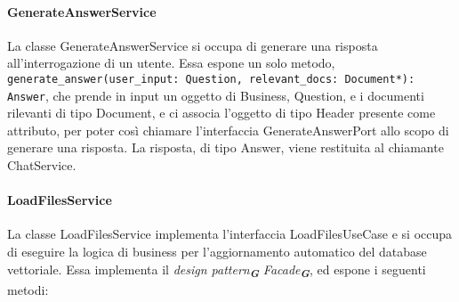 \paragraph{GenerateAnswerService}
\label{sec:generate_answer_service}
La classe GenerateAnswerService si occupa di generare una risposta all'interrogazione di un utente. Essa espone un solo metodo, \texttt{generate\_answer(user\_input: Question, relevant\_docs: Document*): Answer}, che prende in input un oggetto di Business, Question, e i documenti rilevanti di tipo Document, e ci associa l'oggetto di tipo Header presente come attributo, per poter così chiamare l'interfaccia GenerateAnswerPort allo scopo di generare una risposta. La risposta, di tipo Answer, viene restituita al chiamante ChatService.

\paragraph{LoadFilesService}
\label{sec:load_files_service}
La classe LoadFilesService implementa l'interfaccia LoadFilesUseCase e si occupa di eseguire la logica di business per l'aggiornamento automatico del database vettoriale. Essa implementa il \emph{design pattern}\textsubscript{\textbf{\textit{G}}} \emph{Facade}\textsubscript{\textbf{\textit{G}}}, ed espone i seguenti metodi:
